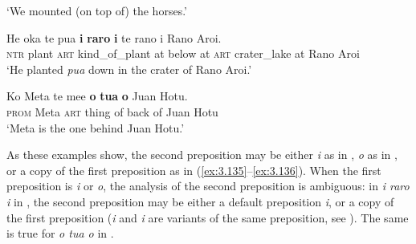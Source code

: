 \glt 
‘We mounted (on top of) the horses.’ \textstyleExampleref{[R126.045]} 
\z

\ea\label{ex:3.137}
\gll He {\ꞌ}oka te pua \textbf{{\ꞌ}i} \textbf{raro} \textbf{i} te rano {\ꞌ}i Rano {\ꞌ}Aroi.  \\
\textsc{ntr} plant \textsc{art} kind\_of\_plant at below at \textsc{art} crater\_lake at Rano Aroi  \\

\glt 
‘He planted \textit{pua} down in the crater of Rano Aroi.’ \textstyleExampleref{[Mtx-6-05.006]}
\z

\ea\label{ex:3.138}
\gll Ko Meta te me{\ꞌ}e \textbf{o} \textbf{tu{\ꞌ}a} \textbf{o} Juan Hotu.\\
\textsc{prom} Meta \textsc{art} thing of back of Juan Hotu\\

\glt
‘Meta is the one behind Juan Hotu.’ \textstyleExampleref{[R412.214]} 
\z

As these examples show, the second preposition may be either \textit{i} as in , \textit{o} as in , or a copy of the first preposition as in (\ref{ex:3.135}–\ref{ex:3.136}). When the first preposition is \textit{{\ꞌ}i} or \textit{o}, the analysis of the second preposition is ambiguous: in \textit{{\ꞌ}i raro i} in , the second preposition may be either a default preposition \textit{i}, or a copy of the first preposition (\textit{{\ꞌ}i} and \textit{i} are variants of the same preposition, see ). The same is true for \textit{o tu{\ꞌ}a o} in .

